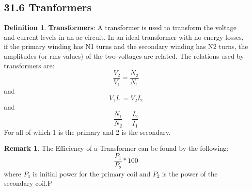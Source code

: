 \documentclass[12pt]{amsart}
\theoremstyle{definition}
\newtheorem{definition}{Definition} %
\newtheorem*{remark}{Remark}        %
\numberwithin{equation}{theorem}    %
\begin{document}
\subsection*{31.6 Tranformers}

    \begin{definition}
        \textbf{Transformers}:
        A transformer is used to transform the voltage and current levels in an ac circuit. In an ideal transformer with no energy losses, if the primary winding has N1 turns and the secondary winding has N2 turns, the amplitudes (or rms values) of the two voltages are related.
        The relations used by transformers are:
        $$\frac{V_2}{V_1} = \frac{N_2}{N_1}$$
        and
        $$V_1I_1 = V_2I_2$$
        and
        $$\frac{N_1}{N_2} = \frac{I_2}{I_1}$$
        For all of which 1 is the primary and 2 is the secondary.
        \begin{remark}
            The Efficiency of a Transformer can be found by the following:
            $$\frac{P_1}{P_2} * 100$$ where $P_1$ is initial power for the
            primary coil and $P_2$ is the power of the secondary coil.P
        
        \end{remark}
    \end{definition}
\end{document}
